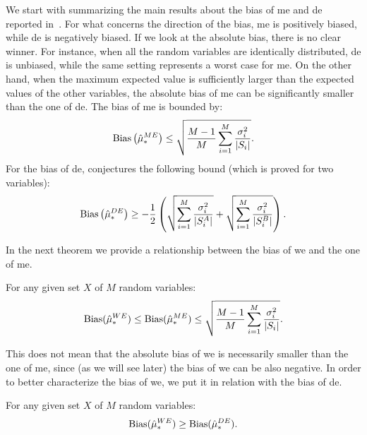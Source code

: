 We start with summarizing the main results about the bias of \gls{me} and \gls{de} reported in~\cite{van2013estimating}.
For what concerns the direction of the bias, \gls{me} is positively biased, while \gls{de} is negatively biased.
If we look at the absolute bias, there is no clear winner. 
For instance, when all the random variables are identically distributed, \gls{de} is unbiased, while the same setting represents a worst case for \gls{me}.
On the other hand, when the maximum expected value is sufficiently larger than the expected values of the other variables, the absolute bias of \gls{me} can be significantly smaller than the one of \gls{de}.
The bias of \gls{me} is bounded by:
$$\mathrm{Bias}\left(\hat\mu_*^{ME}\right) \leq \sqrt{\frac{M-1}{M}\sum_{i=1}^M \frac{\sigma_i^2}{|S_i|}}.$$
For the bias of \gls{de}, \cite{van2013estimating} conjectures the following bound (which is proved for two variables):
$$\mathrm{Bias}\left(\hat\mu_*^{DE}\right) \geq -\frac{1}{2}\left(\sqrt{\sum_{i=1}^M \frac{\sigma_i^2}{|S^A_i|}} + \sqrt{\sum_{i=1}^M \frac{\sigma_i^2}{|S^B_i|}}\right). $$

In the next theorem we provide a relationship between the bias of \gls{we} and the one of \gls{me}.
\begin{theorem}\label{T:BiasWEME}
 For any given set $X$ of $M$ random variables:
 $$\mathrm{Bias}(\hat\mu_*^{WE}) \leq \mathrm{Bias}(\hat\mu_*^{ME}) \leq \sqrt{\frac{M-1}{M}\sum_{i=1}^M \frac{\sigma_i^2}{|S_i|}}.$$
\end{theorem}
This does not mean that the absolute bias of \gls{we} is necessarily smaller than the one of \gls{me}, since (as we will see later) the bias of \gls{we} can be also negative.
In order to better characterize the bias of \gls{we}, we put it in relation with the bias of \gls{de}.
\begin{theorem}\label{T:BiasWECV}
 For any given set $X$ of $M$ random variables:
  $$\mathrm{Bias}(\hat\mu_*^{WE}) \geq \mathrm{Bias}(\hat\mu_*^{DE}).$$
\end{theorem}

